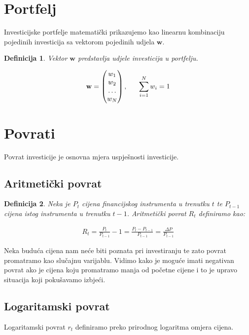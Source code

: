 \documentclass[zavrsnirad]{fer}
\newtheorem{definition}{Definicija}
\begin{document}
\section{Portfelj}
\label{sek:portfelj}
Investicijske portfelje matematički prikazujemo kao linearnu kombinaciju
pojedinih investicija sa vektorom pojedinih udjela $\mathbf{w}$.
\begin{definition}
	Vektor $\mathbf{w}$ predstavlja udjele investicija u portfelju.
\end{definition}
\begin{align*}
	\mathbf{w} = \begin{pmatrix} w_1 \\ w_2 \\ \dots \\ w_N \end{pmatrix},
	\indent \sum_{i = 1}^{N} w_i = 1
\end{align*}

\section{Povrati}
\label{sek:povrati}
Povrat investicije je osnovna mjera uspješnosti investicije.
\subsection{Aritmetički povrat}

\begin{definition}
	Neka je $P_t$ cijena financijskog instrumenta u trenutku $t$ te
    $P_{t-1}$ cijena istog instrumenta u trenutku $t-1$. Aritmetički povrat
    $R_t$ definiramo kao:
\end{definition}
\begin{align*}R_t = \frac{P_t}{P_{t-1}} - 1 =
    \frac{P_t - P_{t-1}}{P_{t-1}} =
\frac{\Delta P}{P_{t-1}}
\end{align*}

\noindent Neka buduća cijena nam neće biti poznata pri investiranju te
zato povrat promatramo kao slučajnu varijablu.
Vidimo kako je moguće imati negativan povrat ako je cijena koju
promatramo manja od početne cijene i to je upravo situacija koji
pokušavamo izbjeći.

\subsection{Logaritamski povrat}
Logaritamski povrat $r_t$ definiramo preko prirodnog logaritma omjera cijena.
\end{document}
